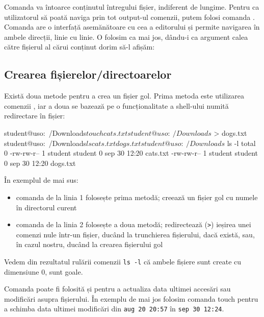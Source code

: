 Comanda va întoarce conținutul întregului fișier, indiferent de lungime. Pentru
ca utilizatorul să poată naviga prin tot output-ul comenzii, putem folosi comanda
. Comanda  are o interfață asemănătoare cu cea a editorului  și
permite navigarea în ambele direcții, linie cu linie. O folosim ca mai jos, dându-i ca argument calea către fișierul al cărui conținut dorim să-l afișăm:


\subsection{Crearea fișierelor/directoarelor}
\label{sec:file-system-file-creation}

Există doua metode pentru a crea un fișier gol. Prima metoda este utilizarea
comenzii , iar a doua se bazează pe o funcționalitate
a shell-ului numită redirectare în fișier:

\begin{screen}
student@uso:~/Downloads$ touch cats.txt
student@uso:~/Downloads$ > dogs.txt
student@uso:~/Downloads$ ls
cats.txt  dogs.txt
student@uso:~/Downloads$ ls -l
total 0
-rw-rw-r-- 1 student student 0 sep 30 12:20 cats.txt
-rw-rw-r-- 1 student student 0 sep 30 12:20 dogs.txt
\end{screen}

În exemplul de mai sus:
\begin{itemize}
	\item comanda de la linia 1 folosește prima metodă; creează un fișier
		gol cu numele  în directorul curent
	\item comanda de la linia 2 folosește a doua metodă; redirectează
		(\texttt{>}) ieșirea unei comenzi nule într-un fișier, ducând la trunchierea fișierului, dacă există, sau, în cazul nostru, ducând la crearea
                fișierului gol 
\end{itemize}
Vedem din rezultatul rulării comenzii \texttt{ls -l} că ambele fișiere sunt create cu dimensiune 0, sunt goale.

Comanda  poate fi folosită și pentru a actualiza data ultimei accesări sau
modificări asupra fișierului. În exemplu de mai jos folosim comanda touch pentru a schimba data ultimei modificări din \texttt{aug 20 20:57} în \texttt{sep 30 12:24}.

